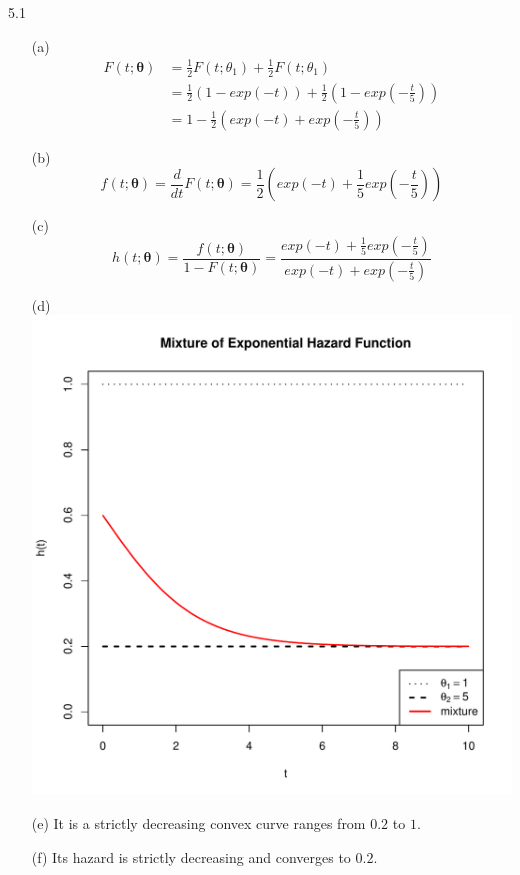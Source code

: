 \documentclass[paper=a4, fontsize=12pt]{scrartcl} %
\numberwithin{equation}{section} %
\numberwithin{figure}{section} %
\numberwithin{table}{section} %
\begin{document}
5.1
\begin{itemize}
	\item[(a)]	\begin{align*}
				F(t; \bm{\theta}) &= \frac{1}{2}F(t; \theta_1) + \frac{1}{2}F(t; \theta_1)\\
							 &= \frac{1}{2}\left(1-exp(-t)\right) + \frac{1}{2}\left(1-exp\left(-\frac{t}{5}\right)\right)\\
							 &= 1- \frac{1}{2}\left( exp(-t) + exp\left(-\frac{t}{5}\right)\right)
			\end{align*}
	
	\item[(b)]	$$f(t; \bm\theta) = \frac{d}{dt} F(t; \bm\theta) =  \frac{1}{2}\left( exp(-t) + \frac{1}{5}exp\left(-\frac{t}{5}\right)\right)$$
	
	\item[(c)]	$$h(t; \bm\theta) = \frac{f(t; \bm\theta)}{1-F(t; \bm\theta)} = \frac{exp(-t) + \frac{1}{5}exp\left(-\frac{t}{5}\right)}{exp(-t) + exp\left(-\frac{t}{5}\right)}$$
	
	\item[(d)]	\ \\ \includegraphics[width = \textwidth]{f_5_1_d.pdf}
	
	\item[(e)]	It is a strictly decreasing convex curve ranges from $0.2$ to $1$. 
	
	\item[(f)]	Its hazard is strictly decreasing and converges to $0.2$.
\end{itemize}
\end{document}

